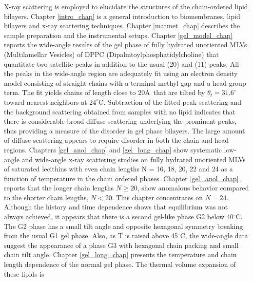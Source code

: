 X-ray scattering is employed to elucidate the structures of the 
chain-ordered lipid bilayers.
Chapter \ref{intro_chap} is a general introduction to biomembranes,
lipid bilayers and x-ray scattering techniques. Chapter \ref{matmet_chap} 
describes the sample preparation and the instrumental setups.
Chapter \ref{gel_model_chap} reports the wide-angle results of the gel phase 
of fully hydrated unoriented MLVs (Multilamellar Vesicles) of DPPC 
(Dipalmtoylphosphatidylcholine) that quantitate two satellite 
peaks in addition to the usual (20) and (11) peaks. All the peaks in the 
wide-angle region are adequately fit using an electron density model 
consisting of straight chains with a terminal methyl gap and a head group 
term.  The fit yields chains of length close to 20\AA \ that are tilted by 
${\theta}_{t}=31.6^{\circ}$ toward nearest neighbors at $24^{\circ}$C. 
Subtraction of the fitted peak scattering and the background scattering 
obtained from samples with no lipid indicates that there is considerable 
broad diffuse scattering underlying the prominent peaks, thus providing a 
measure of the disorder in gel phase bilayers. The large amount of diffuse 
scattering appears to require disorder in both the chain and head regions.
Chapters \ref{gel_anol_chap} and \ref{gel_long_chap} show systematic 
low-angle and wide-angle x-ray scattering studies on fully hydrated 
unoriented MLVs of saturated lecithins with even 
chain lengths N = 16, 
18, 20, 22 and 24 as a function of temperature in the chain ordered phases. 
Chapter \ref{gel_anol_chap} reports that the longer chain lengths
$N \geq 20$, show anomalous behavior compared to the shorter chain lengths,
$N< 20$.  This chapter concentrates on $N = 24$.  Although the history
and time dependence shows that equilibrium was not always achieved, it
appears that there is a second gel-like phase G2 below 40$^{\circ}$C. The 
G2 phase has a small tilt angle and opposite hexagonal symmetry breaking 
from the usual G1 gel phase. Also, as T is raised above 45$^{\circ}$C, the 
wide-angle data suggest the appearance of a phase G3 with hexagonal chain 
packing and small chain tilt angle.
Chapter \ref{gel_long_chap} presents the temperature and chain length 
dependence 
of the normal gel phase. The thermal volume expansion of these lipids is 
